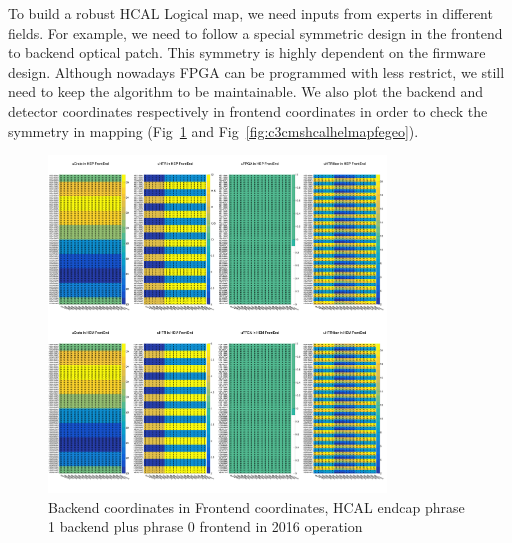 To build a robust HCAL Logical map, we need inputs from experts in different fields. For example, we need to follow a special symmetric design in the frontend to backend optical patch. This symmetry is highly dependent on the firmware design. Although nowadays FPGA can be programmed with less restrict, we still need to keep the algorithm to be maintainable. We also plot the backend and detector coordinates respectively in frontend coordinates in order to check the symmetry in mapping (Fig~\ref{fig:c3cmshcalhelmapfebe} and Fig~\ref{fig:c3cmshcalhelmapfegeo}).

\begin{figure}[htbp]
 \begin{center}
  \includegraphics[width=0.8\textwidth]{figures/c3/c3_cms_hcalhelmapfebe.png}
 \end{center}
 \caption{Backend coordinates in Frontend coordinates, HCAL endcap phrase 1 backend plus phrase 0 frontend in 2016 operation}
 \label{fig:c3cmshcalhelmapfebe}
\end{figure}

